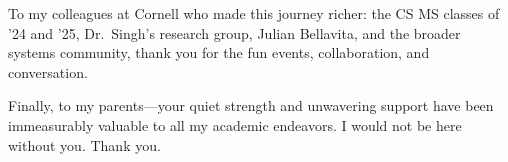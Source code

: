 \begin{acknowledgements}
    To my colleagues at Cornell who made this journey richer:
    the CS MS classes of ’24 and ’25, Dr.\ Singh’s research group,
    Julian Bellavita, and the broader systems community, thank you for the fun events, collaboration, and conversation.

    Finally, to my parents—your quiet strength and
    unwavering support have been immeasurably valuable to all my academic endeavors.
    I would not be here without you.
    Thank you.
\end{acknowledgements}